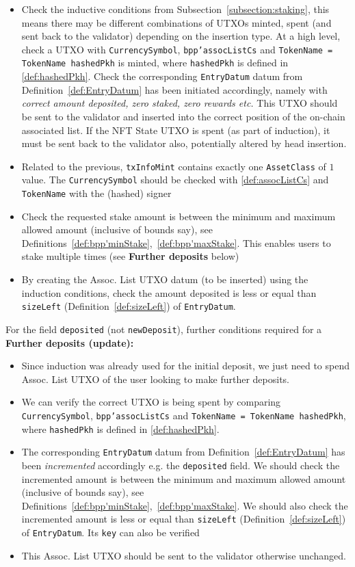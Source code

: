\documentclass[10pt, a4paper]{article}
\theoremstyle{definition}
\begin{document}
\begin{itemize}
\item{Check the inductive conditions from Subsection~\ref{subsection:staking}, this means there may be different combinations of UTXOs minted, spent (and sent back to the validator) depending on the insertion type. At a high level, check a UTXO with \texttt{CurrencySymbol}, \texttt{bpp'assocListCs} and \texttt{TokenName = TokenName hashedPkh} is minted, where \texttt{hashedPkh} is defined in \ref{def:hashedPkh}. Check the corresponding \texttt{EntryDatum} datum from Definition~\ref{def:EntryDatum} has been initiated accordingly, namely with \textit{correct amount deposited, zero staked, zero rewards etc.} This UTXO should be sent to the validator and inserted into the correct position of the on-chain associated list. If the NFT State UTXO is spent (as part of induction), it must be sent back to the validator also, potentially altered by head insertion.}
\item{Related to the previous, \texttt{txInfoMint} contains exactly one \texttt{AssetClass} of $1$ value. The \texttt{CurrencySymbol} should be checked with \ref{def:assocListCs} and \texttt{TokenName} with the (hashed) signer}
\item{Check the requested stake amount is between the minimum and maximum allowed amount (inclusive of bounds say), see Definitions~\ref{def:bpp'minStake},~\ref{def:bpp'maxStake}. This enables users to stake multiple times (see \textbf{Further deposits} below)}
\item{By creating the Assoc. List UTXO datum (to be inserted) using the induction conditions, check the amount deposited is less or equal than \texttt{sizeLeft} (Definition~\ref{def:sizeLeft}) of \texttt{EntryDatum}.}
\end{itemize}
For the field \texttt{deposited} (not \texttt{newDeposit}), further conditions required for a \textbf{Further deposits (update):}
\begin{itemize}
\item{Since induction was already used for the initial deposit, we just need to spend Assoc. List UTXO of the user looking to make further deposits.}
\item{We can verify the correct UTXO is being spent by comparing \texttt{CurrencySymbol}, \texttt{bpp'assocListCs} and \texttt{TokenName = TokenName hashedPkh}, where \texttt{hashedPkh} is defined in \ref{def:hashedPkh}.}
\item{The corresponding \texttt{EntryDatum} datum from Definition~\ref{def:EntryDatum} has been \textit{incremented} accordingly e.g. the \texttt{deposited} field. We should check the incremented amount is between the minimum and maximum allowed amount (inclusive of bounds say), see Definitions~\ref{def:bpp'minStake},~\ref{def:bpp'maxStake}. We should also check the incremented amount is less or equal than \texttt{sizeLeft} (Definition~\ref{def:sizeLeft}) of \texttt{EntryDatum}. Its \texttt{key} can also be verified} 
\item{This Assoc. List UTXO should be sent to the validator otherwise unchanged.}
\end{itemize}
\end{document}
